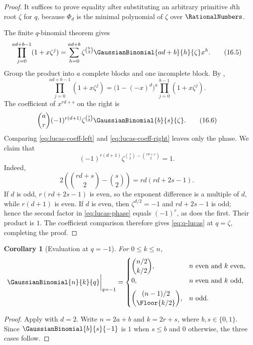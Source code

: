 \documentclass[11pt,a4paper,oneside,openany]{book}
\newtheorem{corollary}[corollary]{Corollary}
\theoremstyle{definition}
\theoremstyle{remark}
\begin{document}
\begin{proof}
It suffices to prove equality after substituting an arbitrary primitive $d$th root $\zeta$ for $q$, because $\Phi_d$ is the minimal polynomial of $\zeta$ over $\RationalNumbers$.

The finite $q$-binomial theorem gives
\[
 \prod_{j=0}^{ad+b-1}(1+x\zeta^j)
 =\sum_{h=0}^{ad+b}\zeta^{\binom h2}
   \GaussianBinomial{ad+b}{h}{\zeta}x^h.
 \tag{16.5}\label{eq:lucas-coeff-left}
\]
Group the product into $a$ complete blocks and one incomplete block.  By ,
\[
 \prod_{j=0}^{ad+b-1}(1+x\zeta^j)
 =\bigl(1-(-x)^d\bigr)^a
   \prod_{j=0}^{b-1}(1+x\zeta^j).
\]
The coefficient of $x^{rd+s}$ on the right is
\[
 \binom ar(-1)^{r(d+1)}
 \zeta^{\binom s2}\GaussianBinomial{b}{s}{\zeta}.
 \tag{16.6}\label{eq:lucas-coeff-right}
\]
Comparing \eqref{eq:lucas-coeff-left} and \eqref{eq:lucas-coeff-right} leaves only the phase.  We claim that
\[
 (-1)^{r(d+1)}
 \zeta^{\binom s2-\binom{rd+s}{2}}=1.
 \tag{16.7}\label{eq:lucas-phase}
\]
Indeed,
\[
 2\left(\binom{rd+s}{2}-\binom s2\right)
 =rd(rd+2s-1).
\]
If $d$ is odd, $r(rd+2s-1)$ is even, so the exponent difference is a multiple of $d$, while $r(d+1)$ is even.  If $d$ is even, then $\zeta^{d/2}=-1$ and $rd+2s-1$ is odd; hence the second factor in \eqref{eq:lucas-phase} equals $(-1)^r$, as does the first.  Their product is $1$.  The coefficient comparison therefore gives \eqref{eq:q-lucas} at $q=\zeta$, completing the proof.
\end{proof}

\begin{corollary}[Evaluation at $q=-1$]\label{cor:qminusone}
For $0\le k\le n$,
\[
 \GaussianBinomial{n}{k}{q}\bigg|_{q=-1}
 =\begin{cases}
 \displaystyle\binom{n/2}{k/2},&n\text{ even and }k\text{ even},\\[7pt]
 0,&n\text{ even and }k\text{ odd},\\[7pt]
 \displaystyle\binom{(n-1)/2}{\Floor{k/2}},&n\text{ odd}.
 \end{cases}
\]
\end{corollary}

\begin{proof}
Apply  with $d=2$.  Write $n=2a+b$ and $k=2r+s$, where $b,s\in\{0,1\}$.  Since $\GaussianBinomial{b}{s}{-1}$ is $1$ when $s\le b$ and $0$ otherwise, the three cases follow.
\end{proof}
\end{document}
